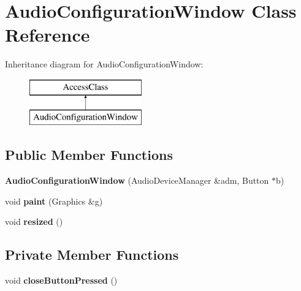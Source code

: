 \hypertarget{classAudioConfigurationWindow}{\section{Audio\-Configuration\-Window Class Reference}
\label{classAudioConfigurationWindow}
}
Inheritance diagram for Audio\-Configuration\-Window\-:\begin{figure}[H]
\begin{center}
\leavevmode
\includegraphics[height=2.000000cm]{classAudioConfigurationWindow}
\end{center}
\end{figure}
\subsection*{Public Member Functions}
\begin{DoxyCompactItemize}
\item 
\hypertarget{classAudioConfigurationWindow_af0cc726b42767b642bad85086cd29703}{{\bfseries Audio\-Configuration\-Window} (Audio\-Device\-Manager \&adm, Button $\ast$b)}\label{classAudioConfigurationWindow_af0cc726b42767b642bad85086cd29703}

\item 
\hypertarget{classAudioConfigurationWindow_a1e31b05a49ec2bbbcca7311dce8d0ad5}{void {\bfseries paint} (Graphics \&g)}\label{classAudioConfigurationWindow_a1e31b05a49ec2bbbcca7311dce8d0ad5}

\item 
\hypertarget{classAudioConfigurationWindow_a75dbdd5bc9773db08c692de134979641}{void {\bfseries resized} ()}\label{classAudioConfigurationWindow_a75dbdd5bc9773db08c692de134979641}

\end{DoxyCompactItemize}
\subsection*{Private Member Functions}
\begin{DoxyCompactItemize}
\item 
\hypertarget{classAudioConfigurationWindow_a6bb20e4ea9ead27b492609a1f3cbe313}{void {\bfseries close\-Button\-Pressed} ()}\label{classAudioConfigurationWindow_a6bb20e4ea9ead27b492609a1f3cbe313}

\end{DoxyCompactItemize}
